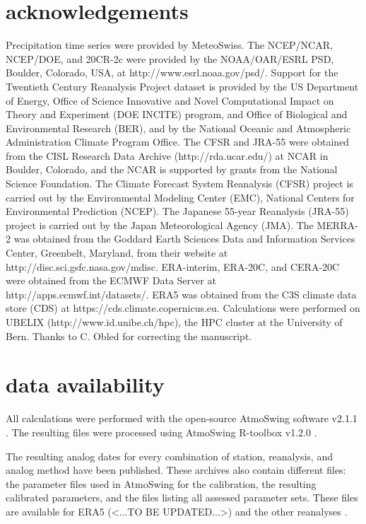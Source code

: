 \documentclass[alpha-refs]{wiley-article}
\begin{document}
\section*{acknowledgements}
Precipitation time series were provided by MeteoSwiss. The NCEP/NCAR, NCEP/DOE, and 20CR-2c were provided by the NOAA/OAR/ESRL PSD, Boulder, Colorado, USA, at http://www.esrl.noaa.gov/psd/. Support for the Twentieth Century Reanalysis Project dataset is provided by the US Department of Energy, Office of Science Innovative and Novel Computational Impact on Theory and Experiment (DOE INCITE) program, and Office of Biological and Environmental Research (BER), and by the National Oceanic and Atmospheric Administration Climate Program Office. The CFSR and JRA-55 were obtained from the CISL Research Data Archive (http://rda.ucar.edu/) at NCAR in Boulder, Colorado, and the NCAR is supported by grants from the National Science Foundation. The Climate Forecast System Reanalysis (CFSR) project is carried out by the Environmental Modeling Center (EMC), National Centers for Environmental Prediction (NCEP). The Japanese 55-year Reanalysis (JRA-55) project is carried out by the Japan Meteorological Agency (JMA). The MERRA-2 was obtained from the Goddard Earth Sciences Data and Information Services Center, Greenbelt, Maryland, from their website at http://disc.sci.gsfc.nasa.gov/mdisc. ERA-interim, ERA-20C, and CERA-20C were obtained from the ECMWF Data Server at http://apps.ecmwf.int/datasets/. ERA5 was obtained from the C3S climate data store (CDS) at https://cds.climate.copernicus.eu. Calculations were performed on UBELIX (http://www.id.unibe.ch/hpc), the HPC cluster at the University of Bern. Thanks to C. Obled for correcting the manuscript.


\section*{data availability}
All calculations were performed with the open-source AtmoSwing software v2.1.1 \citep{Horton2019c}. The resulting files were processed using AtmoSwing R-toolbox v1.2.0 \citep{Horton2018d}.

The resulting analog dates for every combination of station, reanalysis, and analog method have been published. These archives also contain different files: the parameter files used in AtmoSwing for the calibration, the resulting calibrated parameters, and the files listing all assessed parameter sets. These files are available for ERA5 (<...TO BE UPDATED...>) and the other reanalyses \citep[see references in][]{Horton2018b}.
\end{document}
